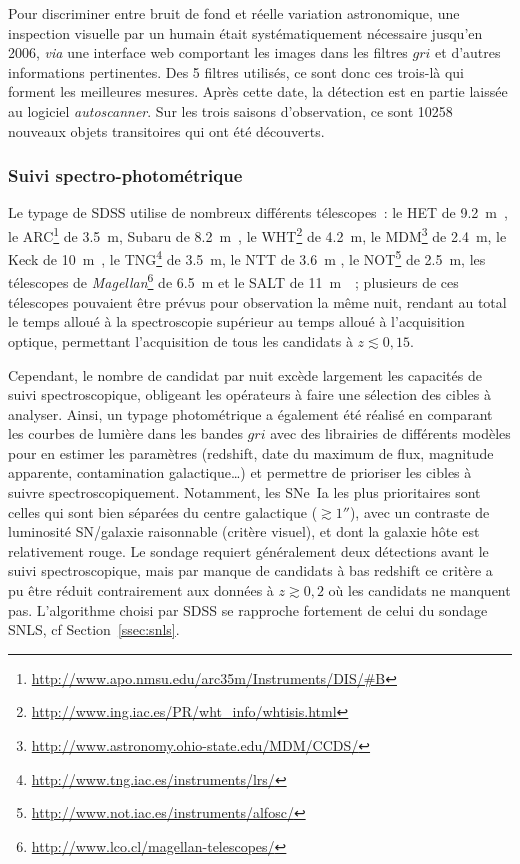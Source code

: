 \documentclass[../main/main.tex]{subfiles}
\begin{document}
Pour discriminer entre bruit de fond et réelle variation astronomique, une
inspection visuelle par un humain était systématiquement nécessaire jusqu'en
2006, \textit{via} une interface web comportant les images dans les filtres
$gri$ et d'autres informations pertinentes. Des 5 filtres utilisés, ce sont donc
ces trois-là qui forment les meilleures mesures. Après cette date, la détection
est en partie laissée au logiciel \textit{autoscanner}. Sur les trois saisons
d'observation, ce sont 10258 nouveaux objets transitoires qui ont été
découverts.

\subsubsection{Suivi spectro-photométrique}\label{sssec:sdssspectro}

Le typage de SDSS utilise de nombreux différents télescopes~: le HET de
\SI{9,2}{m}~\citep{hill1998}, le
ARC\footnote{\href{http://www.apo.nmsu.edu/arc35m/Instruments/DIS/\#B}
{http://www.apo.nmsu.edu/arc35m/Instruments/DIS/\#B}} de \SI{3,5}{m}, Subaru de
\SI{8,2}{m}~\citep{kashikawa2000}, le
WHT\footnote{\href{http://www.ing.iac.es/PR/wht_info/whtisis.html}
{http://www.ing.iac.es/PR/wht\_info/whtisis.html}} de \SI{4,2}{m}, le
MDM\footnote{\href{http://www.astronomy.ohio-state.edu/MDM/CCDS/}
{http://www.astronomy.ohio-state.edu/MDM/CCDS/}} de \SI{2,4}{m}, le Keck de
\SI{10}{m}~\citep{oke1995}, le
TNG\footnote{\href{http://www.tng.iac.es/instruments/lrs/}
{http://www.tng.iac.es/instruments/lrs/}} de \SI{3,5}{m}, le NTT de \SI{3,6}{m}
\citep{dekker1986}, le
NOT\footnote{\href{http://www.not.iac.es/instruments/alfosc/}
{http://www.not.iac.es/instruments/alfosc/}} de \SI{2,5}{m}, les télescopes de
\textit{Magellan}\footnote{\href{http://www.lco.cl/magellan-telescopes/}
{http://www.lco.cl/magellan-telescopes/}} de \SI{6,5}{m} et le SALT de
\SI{11}{m}~\citep{burgh2003}~; plusieurs de ces télescopes pouvaient être prévus
pour observation la même nuit, rendant au total le temps alloué à la
spectroscopie supérieur au temps alloué à l'acquisition optique, permettant
l'acquisition de tous les candidats à $z \lesssim 0,15$.

Cependant, le nombre de candidat par nuit excède largement les capacités de
suivi spectroscopique, obligeant les opérateurs à faire une sélection des cibles
à analyser. Ainsi, un typage photométrique a également été réalisé en comparant
les courbes de lumière dans les bandes $gri$ avec des librairies de différents
modèles pour en estimer les paramètres (redshift, date du maximum de flux,
magnitude apparente, contamination galactique…) et permettre de prioriser les
cibles à suivre spectroscopiquement. Notamment, les SNe~Ia les plus prioritaires
sont celles qui sont bien séparées du centre galactique ($\gtrsim \ang{;;1}$),
avec un contraste de luminosité SN/galaxie raisonnable (critère visuel), et dont
la galaxie hôte est relativement rouge. Le sondage requiert généralement deux
détections avant le suivi spectroscopique, mais par manque de candidats à bas
redshift ce critère a pu être réduit contrairement aux données à $z \gtrsim 0,2$
où les candidats ne manquent pas. L'algorithme choisi par SDSS se rapproche
fortement de celui du sondage SNLS, cf Section~\ref{ssec:snls}.
\end{document}
